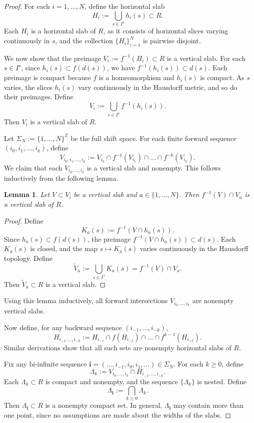 \documentclass[12pt]{iopart}
\newtheorem{lemma}[theorem]{Lemma}
\begin{document}
\begin{proof}
For each \( i = 1, \dots, N \), define the horizontal slab
\[
H_i := \bigcup_{s \in I^s} h_i(s) \subset R.
\]
Each \( H_i \) is a horizontal slab of \( R \), as it consists of horizontal slices varying continuously in \( s \), and the collection \( \{H_i\}_{i=1}^N \) is pairwise disjoint.

We now show that the preimage \( V_i := f^{-1}(H_i) \subset R \) is a vertical slab. For each \( s \in I^s \), since \( h_i(s) \subset f(d(s)) \), we have \( f^{-1}(h_i(s)) \subset d(s) \). Each preimage is compact because \( f \) is a homeomorphism and \( h_i(s) \) is compact. As \( s \) varies, the slices \( h_i(s) \) vary continuously in the Hausdorff metric, and so do their preimages. Define
\[
V_i := \bigcup_{s \in I^s} f^{-1}(h_i(s)).
\]
Then \( V_i \) is a vertical slab of \( R \).

Let \( \Sigma_N := \{1, \dots, N\}^\mathbb{Z} \) be the full shift space. For each finite forward sequence \( (i_0, i_1, \dots, i_k) \), define
\[
V_{i_0, i_1, \dots, i_k} := V_{i_0} \cap f^{-1}(V_{i_1}) \cap \dots \cap f^{-k}(V_{i_k}).
\]
We claim that each \( V_{i_0, \dots, i_k} \) is a vertical slab and nonempty. This follows inductively from the following lemma.

\begin{lemma}
Let \( V \subset V_i \) be a vertical slab and \( a \in \{1, \dots, N\} \). Then \( f^{-1}(V) \cap V_a \) is a vertical slab of \( R \).
\end{lemma}

\begin{proof}
Define
\[
K_a(s) := f^{-1}(V \cap h_a(s)).
\]
Since \( h_a(s) \subset f(d(s)) \), the preimage \( f^{-1}(V \cap h_a(s)) \subset d(s) \). Each \( K_a(s) \) is closed, and the map \( s \mapsto K_a(s) \) varies continuously in the Hausdorff topology. Define
\[
\tilde{V}_a := \bigcup_{s \in I^s} K_a(s) = f^{-1}(V) \cap V_a.
\]
Then \( \tilde{V}_a \subset R \) is a vertical slab.
\end{proof}

Using this lemma inductively, all forward intersections \( V_{i_0, \dots, i_k} \) are nonempty vertical slabs.

Now define, for any backward sequence \( (i_{-1}, \dots, i_{-k}) \),
\[
H_{i_{-1}, \dots, i_{-k}} := H_{i_{-1}} \cap f(H_{i_{-2}}) \cap \dots \cap f^{k-1}(H_{i_{-k}}).
\]
Similar derivations show that all such sets are nonempty horizontal slabs of \( R \).

Fix any bi-infinite sequence \( \mathbf{i} = (\dots, i_{-1}, i_0, i_1, \dots) \in \Sigma_N \). For each \( k \geq 0 \), define
\[
\Lambda_k := V_{i_0, \dots, i_k} \cap H_{i_{-1}, \dots, i_{-k}}.
\]
Each \( \Lambda_k \subset R \) is compact and nonempty, and the sequence \( \{\Lambda_k\} \) is nested. Define
\[
\Lambda_{\mathbf{i}} := \bigcap_{k \geq 0} \Lambda_k.
\]
Then \( \Lambda_{\mathbf{i}} \subset R \) is a nonempty compact set. In general, \( \Lambda_{\mathbf{i}} \) may contain more than one point, since no assumptions are made about the widths of the slabs.


\end{proof}
\end{document}
